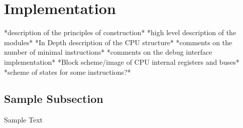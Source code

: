 \section{Implementation} \label{sec:impl}
*description of the principles of construction*
*high level description of the modules*
*In Depth description of the CPU structure*
*comments on the number of minimal instructions*
*comments on the debug interface implementation*
*Block scheme/image of CPU internal registers and buses*
*scheme of states for some instructions?*
\subsection{Sample Subsection}  \label{ssec:laser_technology}
Sample Text \cite{OurWork}